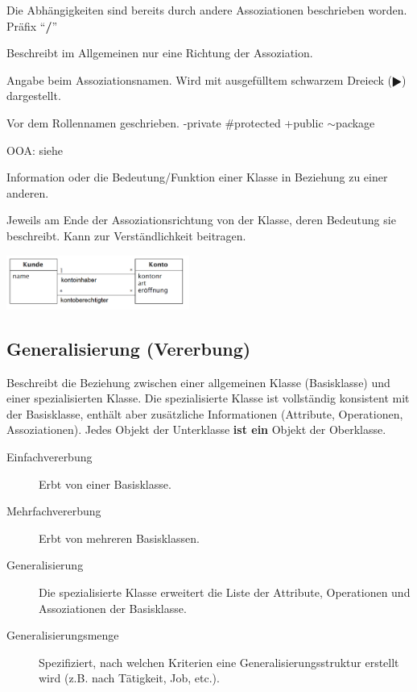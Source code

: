 \begin{description}
    \item[abgeleitete Assoziation] 
      Die Abhängigkeiten sind bereits durch andere Assoziationen beschrieben worden.
      Präfix "`\textbf{/}"'
    \item[Assoziationsname] 
      Beschreibt im Allgemeinen nur eine Richtung der Assoziation. 
    \item[Leserichtung] 
      Angabe beim Assoziationsnamen. Wird mit ausgefülltem schwarzem Dreieck ($\RHD$) dargestellt.
    \item[Sichtbarkeit] 
      Vor dem Rollennamen geschrieben. -private \#protected +public $\sim$package
    \item[Eigenschaftswerte] 
      OOA: siehe 
      
    \parbox{8cm}{
      \item[Rolle]
        Information oder die Bedeutung/Funktion einer Klasse in Beziehung zu einer anderen.
      \item[Rollenname]
        Jeweils am Ende der Assoziationsrichtung von der Klasse, 
        deren Bedeutung sie beschreibt. Kann zur Verständlichkeit beitragen.}
    \hspace{0.5cm}
    \parbox{6cm}{\includegraphics[width=6cm]{./images/Rolle.png}}
  \end{description}

\subsection{Generalisierung (Vererbung) }
  Beschreibt die Beziehung zwischen einer allgemeinen Klasse (Basisklasse) und
  einer spezialisierten Klasse. Die spezialisierte Klasse ist vollständig
  konsistent mit der Basisklasse, enthält aber zusätzliche Informationen
  (Attribute, Operationen, Assoziationen). Jedes Objekt der Unterklasse \textbf{ist ein} 
  Objekt der Oberklasse.
  
  \begin{description}
    \item[Einfachvererbung]
      Erbt von einer Basisklasse.
    \item[Mehrfachvererbung]
      Erbt von mehreren Basisklassen.
    \item[Generalisierung] 
      Die spezialisierte Klasse erweitert die Liste der
      Attribute, Operationen und Assoziationen der Basisklasse.
    \item[Generalisierungsmenge] 
      Spezifiziert, nach welchen Kriterien eine Generalisierungsstruktur erstellt wird (z.B. nach Tätigkeit, Job, etc.).
  \end{description}

